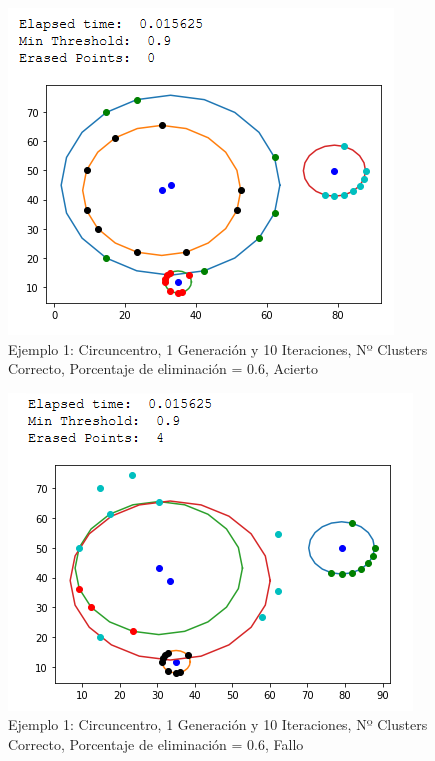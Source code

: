 \documentclass[conference,a4paper]{IEEEtran}
\begin{document}
\begin{figure}[H]
\centering
\includegraphics[scale=0.65]{Experimentacion/Ejemplo1/ej1_c_1_10_me_correct}
\caption{Ejemplo 1: Circuncentro, 1 Generación y 10 Iteraciones,  Nº Clusters Correcto, Porcentaje de eliminación = 0.6, Acierto\\}
\end{figure}

\begin{figure}[H]
\centering
\includegraphics[scale=0.65]{Experimentacion/Ejemplo1/ej1_c_1_10_me_wrong}
\caption{Ejemplo 1: Circuncentro, 1 Generación y 10 Iteraciones,  Nº Clusters Correcto, Porcentaje de eliminación = 0.6, Fallo\\}
\end{figure}
\end{document}
